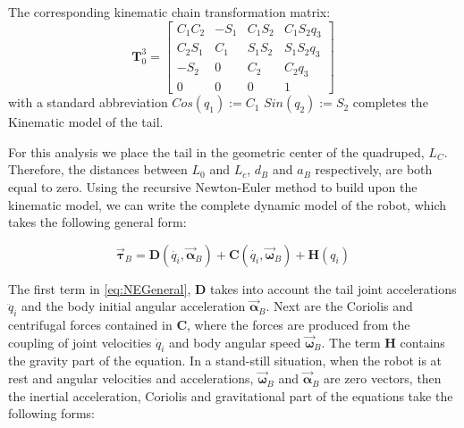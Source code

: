 The corresponding kinematic chain transformation matrix:
\begin{equation}\label{eq:T03}
\textbf{T}_0^3=\begin{bmatrix}
C_1 C_2 & -S_1 & C_1 S_2 & C_1 S_2 q_3 \\
C_2 S_1 & C_1 & S_1 S_2 & S_1 S_2 q_3 \\
-S_2 & 0 & C_2 & C_2 q_3 \\
 0 & 0 & 0 & 1
\end{bmatrix}
\end{equation}
with a standard abbreviation $Cos(q_1):=C_1$ $Sin(q_2):=S_2$ completes the Kinematic model of the tail. 

For this analysis we place the tail in the geometric center of the quadruped, $L_C$. Therefore, the distances between $L_0$ and $L_c$, $d_B$ and $a_B$ respectively, are both equal to zero. Using the recursive Newton-Euler method to build upon the kinematic model, we can write the complete dynamic model of the robot, which takes the following general form:

\begin{equation}\label{eq:NEGeneral}
\vec{\boldsymbol{\tau}}_B=\mathbf{D}\left ( \ddot{q_i},\vec{\boldsymbol{\alpha}}_B \right )+\mathbf{C}\left ( \dot{q_i},\vec{\boldsymbol{\omega}}_B \right )+\mathbf{H}\left ( {q_i} \right )
\end{equation}

The first term in \eqref{eq:NEGeneral}, $\mathbf{D}$ takes into account the tail joint accelerations $\ddot{q}_i$ and the body initial angular acceleration $\vec{\boldsymbol{\alpha}}_B$. Next are the Coriolis and centrifugal forces contained in $\mathbf{C}$, where the forces are produced from the coupling of joint velocities $\dot{q}_i$ and body angular speed $\vec{\boldsymbol{\omega}}_B$. The term $\mathbf{H}$ contains the gravity part of the equation. In a stand-still situation, when the robot is at rest and angular velocities and accelerations,  $\vec{\boldsymbol{\omega}}_B$ and  $\vec{\boldsymbol{\alpha}}_B$ are zero vectors, then the inertial acceleration, Coriolis and gravitational part of the equations take the following forms:
 
